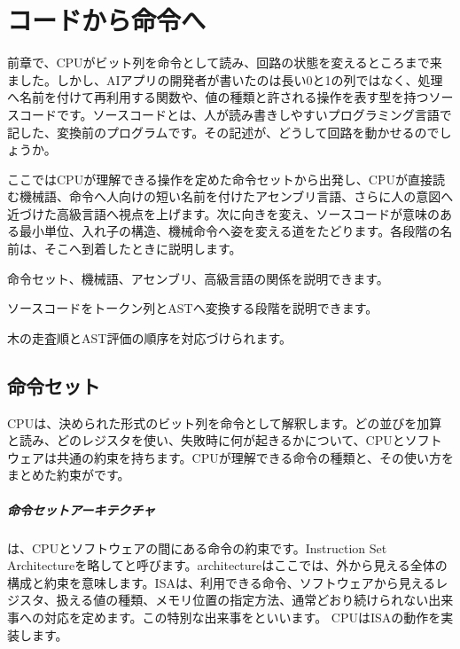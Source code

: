 \chapter{コードから命令へ}
\label{chap:language}

\begin{chapterabstract}
前章で、CPUがビット列を命令として読み、回路の状態を変えるところまで来ました。しかし、AIアプリの開発者が書いたのは長い0と1の列ではなく、処理へ名前を付けて再利用する関数や、値の種類と許される操作を表す型を持つソースコードです。ソースコードとは、人が読み書きしやすいプログラミング言語で記した、変換前のプログラムです。その記述が、どうして回路を動かせるのでしょうか。

ここではCPUが理解できる操作を定めた命令セットから出発し、CPUが直接読む機械語、命令へ人向けの短い名前を付けたアセンブリ言語、さらに人の意図へ近づけた高級言語へ視点を上げます。次に向きを変え、ソースコードが意味のある最小単位、入れ子の構造、機械命令へ姿を変える道をたどります。各段階の名前は、そこへ到着したときに説明します。
\end{chapterabstract}

\begin{learninggoals}
  \item 命令セット、機械語、アセンブリ、高級言語の関係を説明できます。
  \item ソースコードをトークン列とASTへ変換する段階を説明できます。
  \item 木の走査順とAST評価の順序を対応づけられます。
\end{learninggoals}



\section{命令セット}
\label{sec:02-language-01}

CPUは、決められた形式のビット列を命令として解釈します。どの並びを加算と読み、どのレジスタを使い、失敗時に何が起きるかについて、CPUとソフトウェアは共通の約束を持ちます。CPUが理解できる命令の種類と、その使い方をまとめた約束がです。

\begingroup
\begingroup
\paragraph{命令セットアーキテクチャ}
        は、CPUとソフトウェアの間にある命令の約束です。Instruction Set Architectureを略してと呼びます。architectureはここでは、外から見える全体の構成と約束を意味します。ISAは、利用できる命令、ソフトウェアから見えるレジスタ、扱える値の種類、メモリ位置の指定方法、通常どおり続けられない出来事への対応を定めます。この特別な出来事をといいます。
        CPUはISAの動作を実装します。

